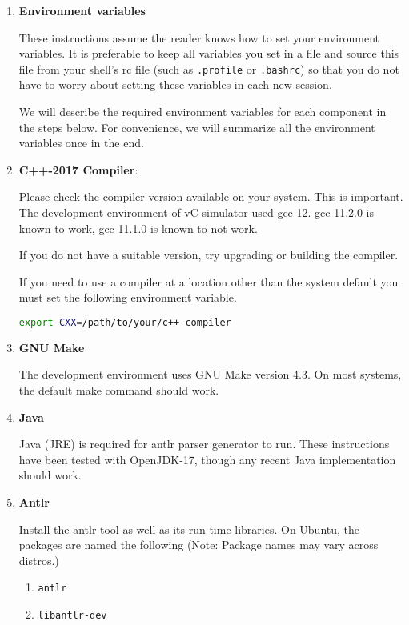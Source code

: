 \documentclass[12pt,a4paper]{article}
\begin{document}
\begin{enumerate}

\item \textbf{Environment variables}

These instructions assume the reader knows how to set your environment variables. It is preferable to keep all variables you set in a file and source this file from your shell's rc file (such as \texttt{.profile} or \texttt{.bashrc}) so that you do not have to worry about setting these variables in each new session.

We will describe the required environment variables for each component in the steps below. For convenience, we will summarize all the environment variables once in the end.

\item \textbf{C++-2017 Compiler}:

Please check the compiler version available on your system. This is important. The development environment of vC simulator used gcc-12. gcc-11.2.0 is known to work, gcc-11.1.0 is known to not work.

If you do not have a suitable version, try upgrading or building the compiler.

If you need to use a compiler at a location other than the system default you must set the following environment variable.

\begin{lstlisting}[language=bash,style=snippet]
export CXX=/path/to/your/c++-compiler
\end{lstlisting}

\item \textbf{GNU Make}

The development environment uses GNU Make version 4.3. On most systems, the default make command should work.

\item \textbf{Java}

Java (JRE) is required for antlr parser generator to run. These instructions have been tested with OpenJDK-17, though any recent Java implementation should work.

\item \textbf{Antlr}

Install the antlr tool as well as its run time libraries. On Ubuntu, the packages are named the following (Note: Package names may vary across distros.)

\begin{enumerate}
\item \texttt{antlr}
\item \texttt{libantlr-dev}
\end{enumerate}


\end{enumerate}
\end{document}
